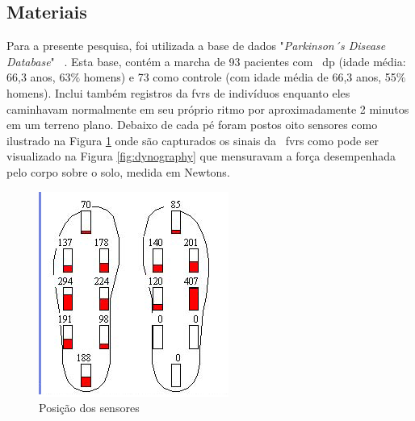 %


\subsection{Materiais}
Para a presente pesquisa, foi utilizada a base de dados "\textit{Parkinson´s Disease Database}" ~\cite{physionet}. Esta base, contém a marcha de 93 pacientes com ~\ac{dp} (idade média: 66,3 anos, 63$\%$ homens) e 73 como controle ​​(com idade média de 66,3 anos, 55$\%$ homens). Inclui também registros da \ac{fvrs} de indivíduos enquanto eles caminhavam normalmente em seu próprio ritmo por aproximadamente 2 minutos em um terreno plano. Debaixo de cada pé foram postos oito sensores como ilustrado na Figura \ref{fig:posicaosensores} onde são capturados os sinais da ~\ac{fvrs} como pode ser visualizado na Figura \ref{fig:dynography} que mensuravam a força desempenhada pelo corpo sobre o solo, medida em Newtons. 

\begin{figure}[!htbp]
 \centering
 \includegraphics[scale=0.7]{./img/ultraflexposition.png}
\caption{Posição dos sensores}
 \label{fig:posicaosensores}
\end{figure}

